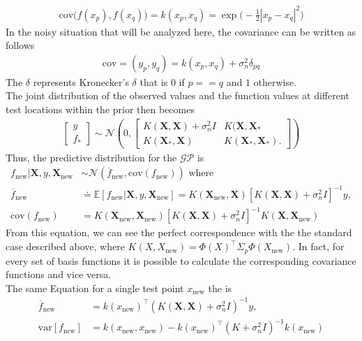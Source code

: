\documentclass[oneside, 11pt]{book}
\begin{document}
\begin{align}
\text{cov}\big(f(x_p),f(x_q)\big)=k(x_p,x_q)=\exp\Big(-\frac{1}{2}|x_p-x_q|^2\Big)
\end{align}
In the noisy situation that will be analyzed here, the covariance can be written as follows
\begin{align}
\text{cov}=(y_p,y_q)=k(x_p,x_q)+\sigma_n^2 \delta_{pq}
\end{align}
The $\delta$ represents Kronecker's $\delta$ that is $0$ if $p==q$ and $1$ otherwise.\\
The joint distribution of the observed values and the function values at different test locations within the prior then becomes
\begin{align}
\begin{bmatrix}  y \\ f_{*} \end{bmatrix} \sim \mathcal{N}\left(0, \begin{bmatrix}  K(\mathbf{X},\mathbf{X})+\sigma_n^2I & K(\mathbf{X},\mathbf{X}_{*} \\K(\mathbf{X}_{*},\mathbf{X}) & K(\mathbf{X}_{*},\mathbf{X}_{*}). \end{bmatrix}\right)
\end{align}
Thus, the predictive distribution for the $\mathcal{GP}$ is
\begin{align}
f_{\text{new}}|\mathbf{X},y,\mathbf{X}_{\text{new}} &\sim \mathcal{N}\left(\overline{f}_{\text{new}}, \text{cov}(f_{\text{new}})\right) \text{ where}\\
\overline{f}_{\text{new}} &\doteq \mathbb{E}[f_{\text{new}}|\mathbf{X},y,\mathbf{X}_{\text{new}}]=K(\mathbf{X}_{\text{new}},\mathbf{X})[K(\mathbf{X},\mathbf{X})+\sigma_n^2I]^{-1}y,\\
\text{cov}(f_{\text{new}})&=K(\mathbf{X}_{\text{new}},\mathbf{X}_{\text{new}})[K(\mathbf{X},\mathbf{X})+\sigma_n^2I]^{-1}K(\mathbf{X},\mathbf{X}_{\text{new}})
\end{align}
From this equation, we can see the perfect correspondence with the the standard case described above, where $K(X,X_{\text{new}})=\Phi(X)^\top\Sigma_p \Phi(X_{\text{new}})$. In fact, for every set of basis functions it is possible to calculate the corresponding covariance functions and vice versa.\\
The same Equation for a single test point $x_{\text{new}}$ the is 
\begin{align}
\overline{f}_{\text{new}}&=k(x_{\text{new}})^\top(K(\mathbf{X},\mathbf{X})+\sigma_n^2I)^{-1}y,\\
\text{var}[f_{\text{new}}]&=k(x_{\text{new}},x_{\text{new}})-k(x_{\text{new}})^\top(K+\sigma_n^2I)^{-1}k(x_{\text{new}})
\end{align}
\end{document}
